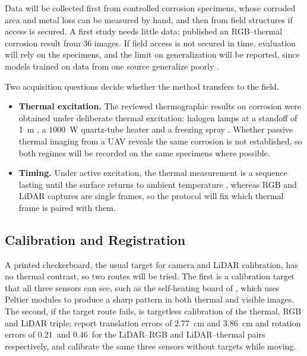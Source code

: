 Data will be collected first from controlled corrosion specimens, whose
corroded area and metal loss can be measured by hand, and then from field
structures if access is secured. A first study needs little data:
\citet{Lim2021} published an RGB--thermal corrosion result from 36 images. If
field access is not secured in time, evaluation will rely on the specimens, and
the limit on generalization will be reported, since models trained on data from
one source generalize poorly \citep{Nash2022}.

Two acquisition questions decide whether the method transfers to the field.
\begin{itemize}
  \item \textbf{Thermal excitation.} The reviewed thermographic results on
        corrosion were obtained under deliberate thermal excitation: halogen
        lamps at a standoff of 1~m \citep{Lim2021}, a 1000~W quartz-tube heater
        \citep{Elizalde2023} and a freezing spray \citep{Doshvarpassand2022}.
        Whether passive thermal imaging from a UAV reveals the same corrosion is
        not established, so both regimes will be recorded on the same
        specimens where possible.
  \item \textbf{Timing.} Under active excitation, the thermal measurement is a
        sequence lasting until the surface returns to ambient temperature
        \citep{Doshvarpassand2022}, whereas RGB and LiDAR captures are single
        frames, so the protocol will fix which thermal frame is paired with them.
\end{itemize}

\subsection{Calibration and Registration}
\label{sec:registration}

A printed checkerboard, the usual target for camera and LiDAR calibration, has
no thermal contrast, so two routes will be tried. The first is a calibration
target that all three sensors can see, such as the self-heating board of
\citet{Nooralishahi2022}, which uses Peltier modules to produce a sharp pattern
in both thermal and visible images. The second, if the target route fails, is
targetless calibration of the thermal, RGB and LiDAR triple; \citet{Yang2024}
report translation errors of 2.77~cm and 3.86~cm and rotation errors of
0.21\textdegree\ and 0.46\textdegree\ for the LiDAR--RGB and LiDAR--thermal pairs
respectively, and \citet{Tran2024} calibrate the same three sensors without
targets while moving.

